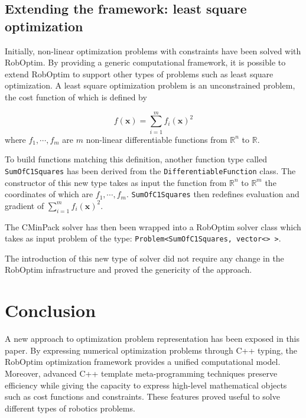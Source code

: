 \documentclass[conference,final,a4paper,twocolumn,9pt]{IEEEtran}
\begin{document}
\subsection{Extending the framework: least square optimization}


Initially, non-linear optimization problems with constraints have been
solved with RobOptim. By providing a generic computational framework,
it is possible to extend RobOptim to support other types of problems
such as least square optimization. A least square optimization problem
is an unconstrained problem, the cost function of which is defined by

\begin{equation}
  f(\mathbf{x}) = \sum_{i=1}^m f_i (\mathbf{x})^2
\end{equation}
where $f_1,\cdots,f_m$ are $m$ non-linear differentiable functions from $\mathbb{R}^n$ to $\mathbb{R}$.

To build functions matching this definition, another function type
called \texttt{SumOfC1Squares} has been derived from the
\texttt{DifferentiableFunction} class. The constructor of this new type takes
as input the function from $\mathbb{R}^n$ to $\mathbb{R}^m$ the coordinates of
which are $f_1,\cdots,f_m$. \texttt{SumOfC1Squares} then redefines evaluation
and gradient of $\sum_{i=1}^m f_i (\mathbf{x})^2$.

The CMinPack solver has then
been wrapped into a RobOptim solver class which takes as input problem
of the type: \texttt{Problem<SumOfC1Squares, vector<> >}.

The introduction of this new type of solver did not require any change
in the RobOptim infrastructure and proved the genericity of the
approach.


\section{Conclusion}\label{sec:conclusion}


A new approach to optimization problem representation has been exposed
in this paper. By expressing numerical optimization problems through
C++ typing, the RobOptim optimization framework provides a unified
computational model. Moreover, advanced C++ template meta-programming
techniques preserve efficiency while giving the capacity to express
high-level mathematical objects such as cost functions and
constraints. These features proved useful to solve different types of
robotics problems.
\end{document}
